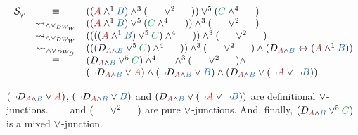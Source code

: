 \begin{example}
$$
\begin{array}{rcl}
\struct{\varphi} 
& \equiv &
((\hA{A} \structplus^1 \hB{B}) \structplus^3 (\hC{\structdual{B}} \structtimes^2 \hD{\structdual{A}}))
\structtimes^5
(\hE{C} \structplus^4 \hF{\structdual{C}}) \\
%
& \normalizePlusTimesDWw &
	((\hA{A} \structplus^1 \hB{B})\structtimes^5 (\hE{C} \structplus^4 \hF{\structdual{C}}))
\structplus^3 
	(\hC{\structdual{B}} \structtimes^2 \hD{\structdual{A}}) \\
%
& \normalizePlusTimesDWw &
	((((\hA{A} \structplus^1 \hB{B})\structtimes^5 \hE{C}) \structplus^4 \hF{\structdual{C}}))
\structplus^3 
	(\hC{\structdual{B}} \structtimes^2 \hD{\structdual{A}}) \\
%
& \normalizePlusTimesDWd &
	(((D_{\hA{A} \structplus \hB{B}} \structtimes^5 \hE{C}) \structplus^4 \hF{\structdual{C}}))
\structplus^3 
	(\hC{\structdual{B}} \structtimes^2 \hD{\structdual{A}}) 
\structplus
(D_{\hA{A} \structplus \hB{B}} \biimp (\hA{A} \structplus^1 \hB{B})) \\
%
& \equiv &
	(D_{\hA{A} \structplus \hB{B}} \structtimes^5 \hE{C}) 
\structplus^4 
	\hF{\structdual{C}}
\structplus^3 
	(\hC{\structdual{B}} \structtimes^2 \hD{\structdual{A}}) 
\structplus \\
&		   &	
	(\neg D_{\hA{A} \structplus \hB{B}} \structtimes \hA{A} ) 
\structplus
	(\neg D_{\hA{A} \structplus \hB{B}} \structtimes \hB{B} )
\structplus
	(D_{\hA{A} \structplus \hB{B}} \structtimes (\neg \hA{A} \structtimes \neg \hB{B})) \\
\end{array}
$$

$(\neg D_{\hA{A} \structplus \hB{B}} \structtimes \hA{A} )$, $(\neg D_{\hA{A} \structplus \hB{B}} \structtimes \hB{B} )$ and $(D_{\hA{A} \structplus \hB{B}} \structtimes (\neg \hA{A} \structtimes \neg \hB{B}))$ are definitional $\vee$-junctions. $\hF{\structdual{C}}$ and $(\hC{\structdual{B}} \structtimes^2 \hD{\structdual{A}})$ are pure $\vee$-junctions. And, finally, $(D_{\hA{A} \structplus \hB{B}} \structtimes^5 \hE{C})$ is a mixed $\vee$-junction.
\end{example}



